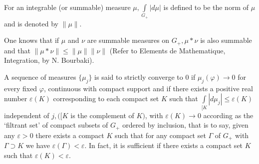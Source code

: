 \begin{definition}\label{chap17:def17.5}
For an integrable (or summable) measure $\mu, \int\limits_{G_+}
|d\mu|$ is defined to be the norm of $\mu$ and is denoted by
$\parallel \mu \parallel$.

One knows that if $\mu$ and $\nu$ are summable measures on $G_+, \mu *
\nu$ is also summable and that $\parallel \mu * \nu \parallel \leq
\parallel \mu \parallel \parallel \nu \parallel$ (Refer to Elements de
Mathematique, Integration, by N. Bourbaki). 
\end{definition}


\begin{definition}\label{chap17:def17.6}
A sequence of measures $\{ \mu_j\}$ is said to strictly converge to
$0$ if $\mu_j(\varphi) \to 0$ for every fixed $\varphi$, continuous
with compact support and if there exists a positive real number
$\varepsilon (K)$ corresponding to each compact set $K$ such that
$\int\limits_{[ K} |d\mu_j| \leq \varepsilon (K)$ independent of $j,
  ([K$ is the complement of $K)$, with $\varepsilon(K) \to 0$
    according as the `filtrant set' of compact subsets of $G_+$
    ordered by inclusion, that is to say, given any $\varepsilon > 0$
    there exists a compact $K$ such that for any compact set $\Gamma$
    of $G_+$ with $\Gamma \supset K$ we have $\varepsilon
    (\Gamma)<\varepsilon$. In fact, it is sufficient if there exists a
    compact set $K$ such that $\varepsilon (K) < \varepsilon$.  
\end{definition}

